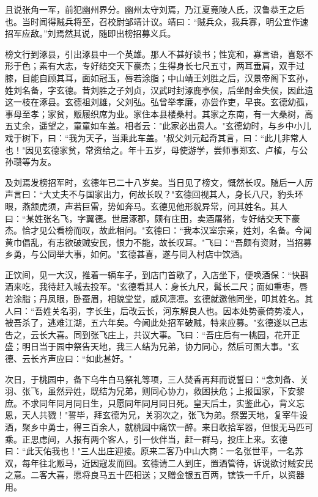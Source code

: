 \documentclass[UTF8,a4paper,twoside,zihao=-4]{ctexrep}
\begin{document}
且说张角一军，前犯幽州界分。幽州太守刘焉，乃江夏竟陵人氏，汉鲁恭王之后也。当时闻得贼兵将至，召校尉邹靖计议。靖曰：``贼兵众，我兵寡，明公宜作速招军应敌。''刘焉然其说，随即出榜招募义兵。

榜文行到涿县，引出涿县中一个英雄。那人不甚好读书；性宽和，寡言语，喜怒不形于色；素有大志，专好结交天下豪杰；生得身长七尺五寸，两耳垂肩，双手过膝，目能自顾其耳，面如冠玉，唇若涂脂；中山靖王刘胜之后，汉景帝阁下玄孙，姓刘名备，字玄德。昔刘胜之子刘贞，汉武时封涿鹿亭侯，后坐酎金失侯，因此遗这一枝在涿县。玄德祖刘雄，父刘弘。弘曾举孝廉，亦尝作吏，早丧。玄德幼孤，事母至孝；家贫，贩屦织席为业。家住本县楼桑村。其家之东南，有一大桑树，高五丈余，遥望之，童童如车盖。相者云："此家必出贵人。"玄德幼时，与乡中小儿戏于树下，曰：``我为天子，当乘此车盖。"叔父刘元起奇其言，曰：``此儿非常人也！"因见玄德家贫，常资给之。年十五岁，母使游学，尝师事郑玄、卢植，与公孙瓒等为友。

及刘焉发榜招军时，玄德年已二十八岁矣。当日见了榜文，慨然长叹。随后一人厉声言曰：``大丈夫不与国家出力，何故长叹？"玄德回视其人，身长八尺，豹头环眼，燕颔虎须，声若巨雷，势如奔马。玄德见他形貌异常，问其姓名。其人曰：``某姓张名飞，字翼德。世居涿郡，颇有庄田，卖酒屠猪，专好结交天下豪杰。恰才见公看榜而叹，故此相问。"玄德曰：``我本汉室宗亲，姓刘，名备。今闻黄巾倡乱，有志欲破贼安民，恨力不能，故长叹耳。"飞曰：``吾颇有资财，当招募乡勇，与公同举大事，如何。"玄德甚喜，遂与同入村店中饮酒。

正饮间，见一大汉，推着一辆车子，到店门首歇了，入店坐下，便唤酒保：``快斟酒来吃，我待赶入城去投军。"玄德看其人：身长九尺，髯长二尺；面如重枣，唇若涂脂；丹凤眼，卧蚕眉，相貌堂堂，威风凛凛。玄德就邀他同坐，叩其姓名。其人曰：``吾姓关名羽，字长生，后改云长，河东解良人也。因本处势豪倚势凌人，被吾杀了，逃难江湖，五六年矣。今闻此处招军破贼，特来应募。"玄德遂以己志告之，云长大喜。同到张飞庄上，共议大事。飞曰：``吾庄后有一桃园，花开正盛；明日当于园中祭告天地，我三人结为兄弟，协力同心，然后可图大事。"玄德、云长齐声应曰：``如此甚好。"

次日，于桃园中，备下乌牛白马祭礼等项，三人焚香再拜而说誓曰：``念刘备、关羽、张飞，虽然异姓，既结为兄弟，则同心协力，救困扶危；上报国家，下安黎庶。不求同年同月同日生，只愿同年同月同日死。皇天后土，实鉴此心，背义忘恩，天人共戮！"誓毕，拜玄德为兄，关羽次之，张飞为弟。祭罢天地，复宰牛设酒，聚乡中勇士，得三百余人，就桃园中痛饮一醉。来日收拾军器，但恨无马匹可乘。正思虑间，人报有两个客人，引一伙伴当，赶一群马，投庄上来。玄德曰：``此天佑我也！"三人出庄迎接。原来二客乃中山大商：一名张世平，一名苏双，每年往北贩马，近因寇发而回。玄德请二人到庄，置酒管待，诉说欲讨贼安民之意。二客大喜，愿将良马五十匹相送；又赠金银五百两，镔铁一千斤，以资器用。
\end{document}
